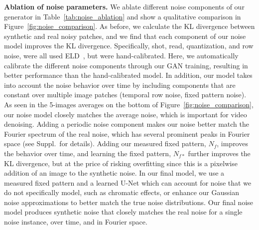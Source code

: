 \documentclass[final]{cvpr}
\begin{document}
\begin{comment}
\begin{table}[thb]
    \centering
    \newcolumntype{Z}{S[table-format=1.3,table-auto-round]}
	\begin{tabularx}{\linewidth}{X@{\hspace{5mm}}Z}
    \toprule
    Noise Model      & {KLD} \\  
    \midrule
ELD~\cite{wei2020physics}      & 1.3607 \\
    Noise Flow~\cite{abdelhamed2019noise}       & 0.3855 \\ 
    CA-GAN model~\cite{chang2020learning}       & 0.5130 \\
    \midrule
    Ours & \textbf{0.0691}\\
    \bottomrule
    \end{tabularx}
    \caption{We compare our noise generator to prior work, representative of different approaches to modeling noise distributions. Our method significantly outperforms all baselines. See Figure~\ref{fig:noise_comparison} for a visual comparison.}
    \label{tab:noise_prior}
    \vspace{-8mm}
\end{table}
\end{comment}




\vspace{1mm}\noindent\textbf{Ablation of noise parameters.}
We ablate different noise components of our generator in Table~\ref{tab:noise_ablation} and show a qualitative comparison in Figure~\ref{fig:noise_comparison}. As before, we calculate the KL divergence between synthetic and real noisy patches, and we find that each component of our noise model improves the KL divergence. Specifically, shot, read, quantization, and row noise, were all used ELD~\cite{wei2020physics}, but were hand-calibrated. Here, we automatically calibrate the different noise components through our GAN training, resulting in better performance than the hand-calibrated model. In addition, our model takes into account the noise behavior over time by including components that are constant over multiple image patches (temporal row noise, fixed pattern noise). As seen in the 5-images averages on the bottom of Figure~\ref{fig:noise_comparison}, our noise model closely matches the average noise, which is important for video denoising. Adding a periodic noise component makes our noise better match the Fourier spectrum of the real noise, which has several prominent peaks in Fourier space (see Suppl.\ for details).  Adding our measured fixed pattern, $N_f$, improves the behavior over time, and learning the fixed pattern, $N_{f*}$ further improves the KL divergence, but at the price of risking overfitting since this is a pixelwise addition of an image to the synthetic noise. In our final model, we use a measured fixed pattern and a learned U-Net which can account for noise that we do not specifically model, such as chromatic effects, or enhance our Gaussian noise approximations to better match the true noise distributions. Our final noise model produces synthetic noise that closely matches the real noise for a single noise instance, over time, and in Fourier space. 
\end{document}
